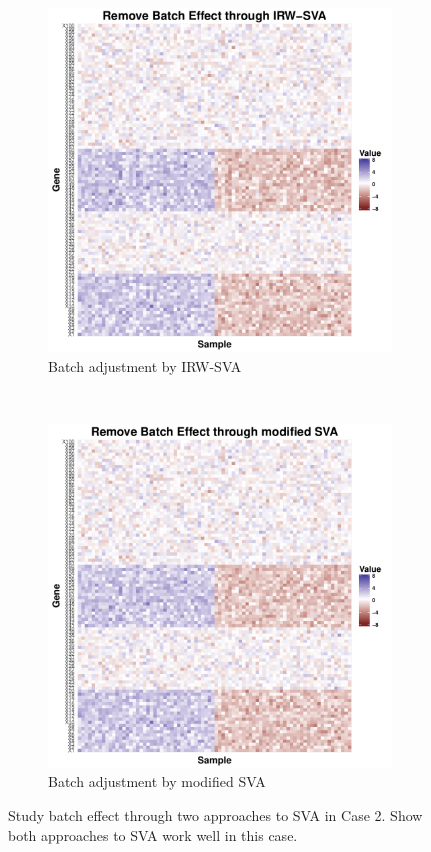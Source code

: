 \documentclass[11pt]{article}
\begin{document}
\begin{figure}[h!]
\begin{subfigure}[b]{0.31\textwidth}
        \includegraphics[width = \textwidth]{figures/sva2.pdf}
        \caption{Batch adjustment by IRW-SVA}
        \label{fig:sva2}
    \end{subfigure}  %
~
    \begin{subfigure}[b]{0.31\textwidth}
        \centering
        \includegraphics[width = \textwidth]{figures/new_sva2.pdf}
        \caption{Batch adjustment by modified SVA}
        \label{fig:new_sva2}
    \end{subfigure}    
    \caption{Study batch effect through two approaches to SVA in Case 2. Show both approaches to SVA work well in this case.}
    \label{fig:svas2}
\end{figure}
\end{document}
